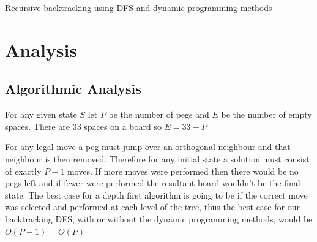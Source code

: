 \documentclass[12pt,a4paper]{report}
\begin{document}
\begin{algorithm}[H]
	\DontPrintSemicolon
  \label{dyn-alg}
	\caption{Recursive backtracking using DFS and dynamic programming methods}
\end{algorithm}

\section*{Analysis}
\subsection*{Algorithmic Analysis}\label{algo-analysis}
For any given state $S$ let $P$ be the number of pegs and $E$ be the number of empty spaces.
There are 33 spaces on a board so $E=33-P$

For any legal move a peg must jump over an orthogonal neighbour and that neighbour is then removed. Therefore for any initial state a solution must consist of exactly $P-1$ moves. If more moves were performed then there would be no pegs left and if fewer were performed the resultant board wouldn't be the final state.
The best case for a depth first algorithm is going to be if the correct move was selected and performed at each level of the tree, thus the best case for our backtracking DFS, with or without the dynamic programming methods,  would be $O(P-1)=O(P)$
\end{document}
